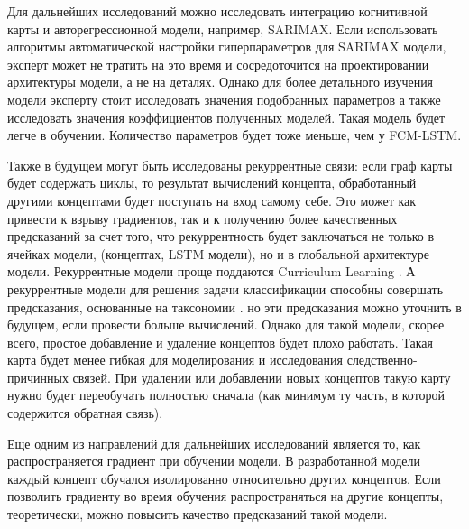 Для дальнейших исследований можно исследовать интеграцию когнитивной карты
и авторегрессионной модели, например, SARIMAX. Если использовать алгоритмы
автоматической настройки гиперпараметров для SARIMAX модели, эксперт может не тратить
на это время и сосредоточится на проектировании архитектуры модели, а не на деталях.
Однако для более детального изучения модели эксперту стоит исследовать
значения подобранных параметров а также исследовать значения
коэффициентов полученных моделей. Такая модель будет легче в
обучении. Количество параметров будет тоже меньше, чем у FCM-LSTM.

Также в будущем могут быть исследованы рекуррентные связи:
если граф карты будет содержать циклы, то результат вычислений
концепта, обработанный другими концептами будет поступать на вход
самому себе. Это может как привести к взрыву градиентов, так и к
получению более качественных предсказаний за счет того, что рекуррентность
будет заключаться не только в ячейках модели, (концептах, LSTM модели), но и в
глобальной архитектуре модели. Рекуррентные модели проще поддаются Curriculum Learning \cite{bengio2009curriculum} \cite{curriculum_taxonomy}.
А рекуррентные модели для решения задачи классификации способны совершать
предсказания, основанные на таксономии \cite{curriculum_taxonomy}.
но эти предсказания можно уточнить в будущем, если провести больше вычислений.
Однако для такой модели, скорее всего,
простое добавление и удаление концептов будет плохо работать. Такая карта будет
менее гибкая для моделирования и исследования следственно-причинных связей.
При удалении или добавлении новых концептов такую карту нужно будет переобучать полностью
сначала (как минимум ту часть, в которой содержится обратная связь).

Еще одним из направлений для дальнейших исследований является то,
как распространяется градиент при обучении модели. В разработанной
модели каждый концепт обучался изолированно относительно других концептов.
Если позволить градиенту во время обучения распространяться на другие
концепты, теоретически, можно повысить качество предсказаний такой модели.
